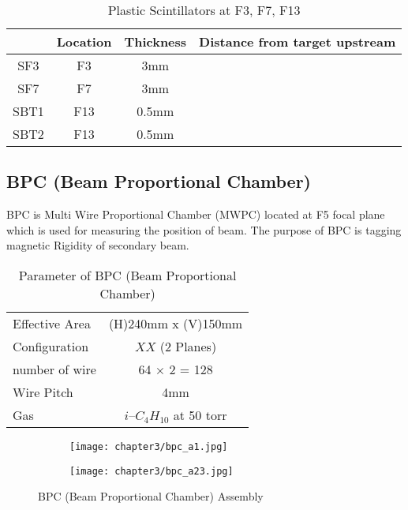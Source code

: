 \begin{table}[h]
    \centering
    \begin{tabular}{c|ccc}
        \hline
        & Location & Thickness & Distance from target upstream \\
        \hline
        SF3 & F3 & 3mm & \\
        SF7 & F7 & 3mm & \\
        SBT1 & F13 &0.5mm & \\
        SBT2 & F13 &0.5mm & \\
        \hline
    \end{tabular}
    \caption{Plastic Scintillators at F3, F7, F13}
\end{table}


\subsection{BPC (Beam Proportional Chamber)}
BPC is Multi Wire Proportional Chamber (MWPC) located at F5 focal plane which is used for measuring the position of beam. The purpose of BPC is tagging magnetic Rigidity of secondary beam.
\begin{table}[h]
    \centering
    \begin{tabular}{l|c}
        \hline
        Effective Area & (H)240mm x (V)150mm \\
        Configuration & $XX$ (2 Planes) \\
        number of wire & 64 $\times$ 2 = 128 \\
        Wire Pitch & 4mm \\
        Gas & $i$--${C}_{4} {H}_{10}$ at 50 torr\\
        \hline
    \end{tabular}
    \caption{Parameter of BPC (Beam Proportional Chamber)}
\end{table}

\clearpage

\begin{figure}[h]
    \centering
    \begin{subfigure}[h]{\textwidth}
        \centering
        \texttt{[image: chapter3/bpc\_a1.jpg]}
    \end{subfigure}
    \begin{subfigure}[h]{\textwidth}
        \hspace{2.4cm}
        \texttt{[image: chapter3/bpc\_a23.jpg]}
    \end{subfigure}
        \caption{BPC (Beam Proportional Chamber) Assembly}
\end{figure}

